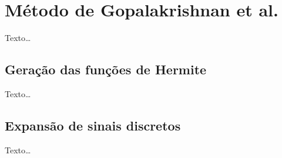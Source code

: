
\section{Método de Gopalakrishnan et al.}
\label{sec:section4}
Texto\ldots

\subsection{Geração das funções de Hermite}
Texto\ldots

\subsection{Expansão de sinais discretos}
Texto\ldots
